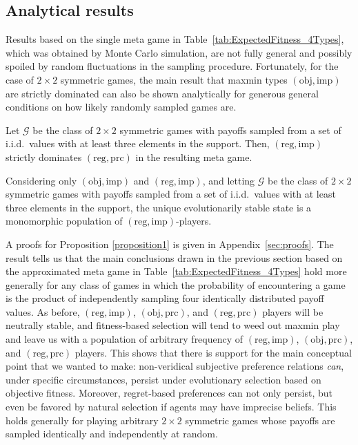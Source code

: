 \documentclass[fleqn,reqno,11pt]{article}
\begin{document}
\subsection{Analytical results}
\label{sec:analytical-results}

Results based on the single meta game in Table~\ref{tab:ExpectedFitness_4Types}, which was
obtained by Monte Carlo simulation, are not fully general and possibly spoiled by random
fluctuations in the sampling procedure. Fortunately, for the case of $2 \times 2$ symmetric
games, the main result that maxmin types $(\text{obj}, \text{imp})$ are strictly dominated can
also be shown analytically for generous general conditions on how likely randomly sampled games
are. 

\begin{proposition} \label{proposition1}
  Let $\mathcal{G}$ be the class of $2 \times 2$ symmetric games with payoffs sampled from a
  set of i.i.d.~values with at least three elements in the support. Then,
  $(\text{reg}, \text{imp})$ strictly dominates $(\text{reg}, \text{prc})$ in the resulting
  meta game.
\end{proposition}

\begin{corollary} \label{corollary1} Considering only $(\text{obj}, \text{imp})$ and
  $(\text{reg}, \text{imp})$, and letting $\mathcal{G}$ be the class of $2 \times 2$ symmetric
  games with payoffs sampled from a set of i.i.d.~values with at least three elements in the
  support, the unique evolutionarily stable state is a monomorphic population of
  $(\text{reg}, \text{imp})$-players.
\end{corollary}

A proofs for Proposition \ref{proposition1} is given in Appendix~\ref{sec:proofs}. The result
tells us that the main conclusions drawn in the previous section based on the approximated meta
game in Table~\ref{tab:ExpectedFitness_4Types} hold more generally for any class of games in
which the probability of encountering a game is the product of independently sampling four
identically distributed payoff values. As before, $(\text{reg}, \text{imp})$,
$(\text{obj}, \text{prc})$, and $(\text{reg}, \text{prc})$ players will be neutrally stable,
and fitness-based selection will tend to weed out maxmin play and leave us with a population of
arbitrary frequency of $(\text{reg}, \text{imp})$, $(\text{obj}, \text{prc})$, and
$(\text{reg}, \text{prc})$ players. This shows that there is support for the main conceptual
point that we wanted to make: non-veridical subjective preference relations \emph{can}, under
specific circumstances, persist under evolutionary selection based on objective
fitness. Moreover, regret-based preferences can not only persist, but even be favored by
natural selection if agents may have imprecise beliefs. This holds generally for playing
arbitrary $2 \times 2$ symmetric games whose payoffs are sampled identically and independently
at random.
\end{document}

